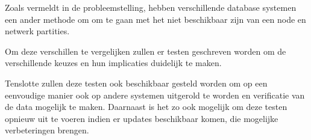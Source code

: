 Zoals vermeldt in de probleemstelling, hebben verschillende database systemen een ander methode om om te gaan met het niet beschikbaar zijn van een node en netwerk partities. 

Om deze verschillen te vergelijken zullen er testen geschreven worden om de verschillende keuzes en hun implicaties duidelijk te maken. 

Tenslotte zullen deze testen ook beschikbaar gesteld worden om op een eenvoudige manier ook op andere systemen uitgerold te worden en verificatie van de data mogelijk te maken. Daarnaast is het zo ook mogelijk om deze testen opnieuw uit te voeren indien er updates beschikbaar komen, die mogelijke verbeteringen brengen. 

